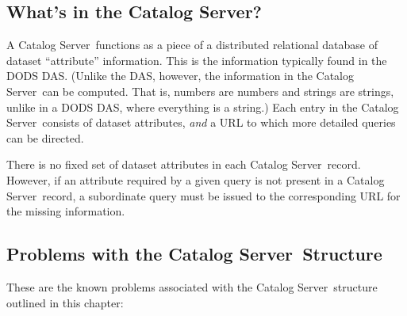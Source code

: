 \documentclass[10pt]{report}
\newcommand{\cs}{Catalog Server}
\begin{document}
%

\subsection{What's in the \cs ?}
\label{sec:structure}

A \cs\ functions as a piece of a distributed relational database of
dataset ``attribute'' information.  This is the information typically
found in the DODS DAS.  (Unlike the DAS, however, the information in
the \cs\ can be computed.  That is, numbers are numbers and strings
are strings, unlike in a DODS DAS, where everything is a string.)  Each
entry in the \cs\ consists of dataset attributes, \emph{and} a URL to
which more detailed queries can be directed.

There is no fixed set of dataset attributes in each \cs\ record.
However, if an attribute required by a given query is not present in
a \cs\ record, a subordinate query must be issued to the corresponding
URL for the missing information.


\subsection{Problems with the \cs\ Structure}
\label{sec:prblems}

These are the known problems associated with the \cs\ structure
outlined in this chapter:
\end{document}
